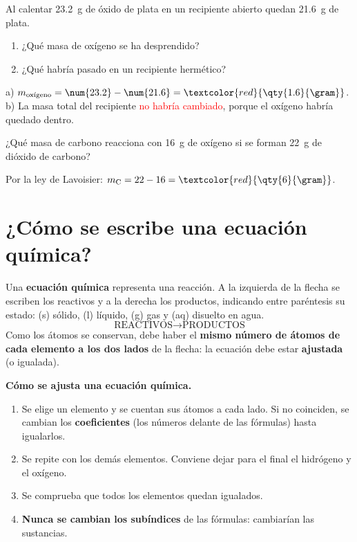 \begin{exercise}
    Al calentar \qty{23.2}{\gram} de óxido de plata en un recipiente abierto quedan \qty{21.6}{\gram} de plata.
    \begin{enumerate}[label=\alph*)]
        \item ¿Qué masa de oxígeno se ha desprendido?
        \item ¿Qué habría pasado en un recipiente hermético?
    \end{enumerate}
    \begin{solu}
        a) \(m_\text{oxígeno} = \num{23.2} - \num{21.6} = \textcolor{red}{\qty{1.6}{\gram}}\). b) La masa total del recipiente \textcolor{red}{no habría cambiado}, porque el oxígeno habría quedado dentro.
    \end{solu}
\end{exercise}

\begin{exercise}
    ¿Qué masa de carbono reacciona con \qty{16}{\gram} de oxígeno si se forman \qty{22}{\gram} de dióxido de carbono?
    \begin{solu}
        Por la ley de Lavoisier: \(m_\text{C} = 22 - 16 = \textcolor{red}{\qty{6}{\gram}}\).
    \end{solu}
\end{exercise}

\section{¿Cómo se escribe una ecuación química?}

Una \textbf{ecuación química} representa una reacción. A la izquierda de la flecha se escriben los reactivos y a la derecha los productos, indicando entre paréntesis su estado: (s) sólido, (l) líquido, (g) gas y (aq) disuelto en agua.
\[ \text{REACTIVOS} \longrightarrow \text{PRODUCTOS} \]
Como los átomos se conservan, debe haber el \textbf{mismo número de átomos de cada elemento a los dos lados} de la flecha: la ecuación debe estar \textbf{ajustada} (o igualada).

\begin{marker}
    \textbf{Cómo se ajusta una ecuación química.}
    \begin{enumerate}[label=\arabic*.]
        \item Se elige un elemento y se cuentan sus átomos a cada lado. Si no coinciden, se cambian los \textbf{coeficientes} (los números delante de las fórmulas) hasta igualarlos.
        \item Se repite con los demás elementos. Conviene dejar para el final el hidrógeno y el oxígeno.
        \item Se comprueba que todos los elementos quedan igualados.
        \item \textbf{Nunca se cambian los subíndices} de las fórmulas: cambiarían las sustancias.
    \end{enumerate}
\end{marker}

